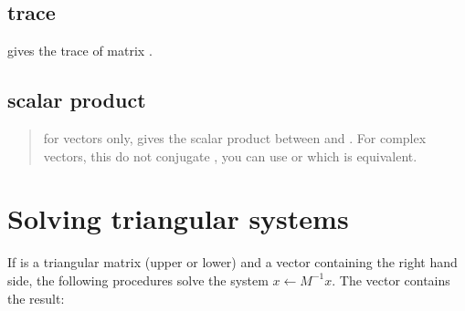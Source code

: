 \documentclass[a4paper,11pt,english]{sphinxmanual}
\begin{document}
\section{trace}
\label{\detokenize{gmm/blas:trace}}
 gives the trace of matrix .


\section{scalar product}
\label{\detokenize{gmm/blas:scalar-product}}\begin{quote}

for vectors only,  gives the scalar product between  and . For complex vectors, this do not conjugate , you can use  or  which is equivalent.
\end{quote}


\chapter{Solving triangular systems}
\label{\detokenize{gmm/triangular:solving-triangular-systems}}\label{\detokenize{gmm/triangular:gmm-triangular}}\label{\detokenize{gmm/triangular::doc}}
If  is a triangular matrix (upper or lower) and  a vector containing the right hand side, the following procedures solve the system \(x \leftarrow M^{-1}x\). The vector  contains the result:

\begin{sphinxVerbatim}[commandchars=\\\{\}]
   
    
   
    
\end{sphinxVerbatim}
\end{document}
